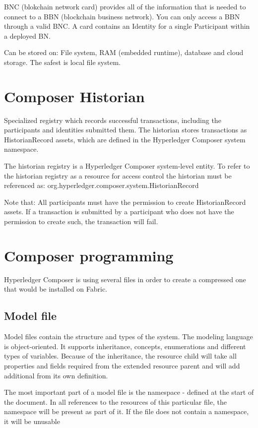 \documentclass[a4paper,11pt]{report}
\begin{document}
BNC (blokchain network card) provides all of the information that is needed to connect to a BBN (blockchain business network). You can only access a BBN through a valid BNC. A card contains an Identity for a single Participant within a deployed BN.

Can be stored on: File system, RAM (embedded runtime), database and cloud storage. The safest is local file system.



\section{Composer Historian}

Specialized registry which records successful transactions, including the participants and identities submitted them. The historian stores transactions as HistorianRecord assets, which are defined in the Hyperledger Composer system namespace.

The historian registry is a Hyperledger Composer system-level entity. To refer to the historian registry as a resource for access control the historian must be referenced as: org.hyperledger.composer.system.HistorianRecord

Note that: All participants must have the permission to create HistorianRecord assets. If a transaction is submitted by a participant who does not have the permission to create such, the transaction will fail.

\section{Composer programming}
\label{composerProgramming}

Hyperledger Composer is using several files in order to create a compressed one that would be installed on Fabric.

\subsection{Model file}
\label{modelfile}
Model files contain the structure and types of the system. The modeling language is object-oriented. It supports inheritance, concepts, enumerations and different types of variables. Because of the inheritance, the resource child will take all properties and fields required from the extended resource parent and will add additional from its own definition. 

The most important part of a model file is the namespace - defined at the start of the document. In all references to the resources of this particular file, the namespace will be present as part of it. If the file does not contain a namespace, it will be unusable 
\end{document}
